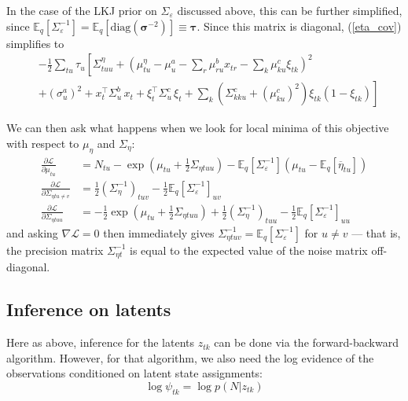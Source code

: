 \documentclass[11pt]{article}
\begin{document}
In the case of the LKJ prior on $\Sigma_\varepsilon$ discussed above, this can be further simplified, since $\mathbb{E}_q[\Sigma_\varepsilon^{-1}] = \mathbb{E}_q[\mathrm{diag}(\boldsymbol{\sigma}^{-2})] \equiv \boldsymbol{\tau}$. Since this matrix is diagonal, (\ref{eta_cov}) simplifies to
\begin{align}
    & -\frac{1}{2} \sum_{tu}\tau_u \left[ \Sigma^\eta_{tuu} +
    \left(\mu^\eta_{tu} - \mu^a_{u} - \sum_r \mu^b_{ru} x_{tr} - \sum_k \mu^c_{ku} \xi_{tk}\right)^2
    \right. \\
    & \left.
    + (\sigma^a_u)^2 + x^\top_t \Sigma^b_u\, x_t +
    \xi^\top_t \Sigma^c_u\, \xi_t +
    \sum_k (\Sigma^c_{kku} + (\mu^c_{ku})^2)\xi_{tk}(1 - \xi_{tk})
    \right]
\end{align}

We can then ask what happens when we look for local minima of this objective with respect to $\mu_\eta$ and $\Sigma_\eta$:
\begin{align}
    \frac{\partial \mathcal{L}}{\partial \mu_{tu}} &=
    N_{tu} - \exp\left(\mu_{tu} + \frac{1}{2} \Sigma_{\eta tuu} \right)
    - \mathbb{E}_q[\Sigma_\varepsilon^{-1}](\mu_{tu} - \mathbb{E}_q[\overline{\eta}_{tu}]) \\
    \frac{\partial \mathcal{L}}{\partial \Sigma_{\eta tu \neq v}} &=
    \frac{1}{2} \left(\Sigma^{-1}_\eta \right)_{tuv}
    -\frac{1}{2}\mathbb{E}_q[\Sigma_\varepsilon^{-1}]_{uv}\\
    \frac{\partial \mathcal{L}}{\partial \Sigma_{\eta tuu}} &=
    -\frac{1}{2} \exp\left(\mu_{tu} + \frac{1}{2} \Sigma_{\eta tuu} \right)
    + \frac{1}{2} \left(\Sigma^{-1}_\eta \right)_{tuu}
    -\frac{1}{2}\mathbb{E}_q[\Sigma_\varepsilon^{-1}]_{uu}
\end{align}
and asking $\nabla \mathcal{L} = 0$ then immediately gives $\Sigma^{-1}_{\eta tuv} = \mathbb{E}_q[\Sigma_\varepsilon^{-1}]$ for $u\neq v$ --- that is, the precision matrix $\Sigma^{-1}_{\eta t}$ is equal to the expected value of the noise matrix off-diagonal.

\subsection{Inference on latents}
Here as above, inference for the latents $z_{tk}$ can be done via the forward-backward algorithm. However, for that algorithm, we also need the log evidence of the observations conditioned on latent state assignments:
\begin{equation}
    \log \psi_{tk} = \log p(N|z_{tk})
\end{equation}
\end{document}
